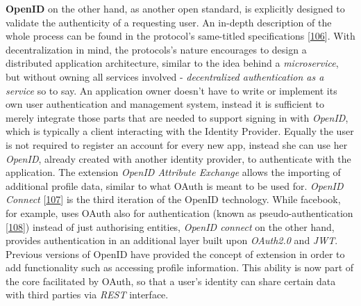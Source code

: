 \documentclass[12pt,english,a4paper,titlepage,cleardoublepage=empty,dottedtoc]{report}
\begin{document}
\textbf{OpenID} on the other hand, as another open standard, is
explicitly designed to validate the authenticity of a requesting user.
An in-depth description of the whole process can be found in the
protocol's same-titled specifications
{[}\protect\hyperlink{ref-web_spec_openid-spec-index}{106}{]}. With
decentralization in mind, the protocols's nature encourages to design a
distributed application architecture, similar to the idea behind a
\emph{microservice}, but without owning all services involved -
\emph{decentralized authentication as a service} so to say. An
application owner doesn't have to write or implement its own user
authentication and management system, instead it is sufficient to merely
integrate those parts that are needed to support signing in with
\emph{OpenID}, which is typically a client interacting with the Identity
Provider. Equally the user is not required to register an account for
every new app, instead she can use her \emph{OpenID}, already created
with another identity provider, to authenticate with the application.
The extension \emph{OpenID Attribute Exchange} allows the importing of
additional profile data, similar to what OAuth is meant to be used for.
\emph{OpenID Connect}
{[}\protect\hyperlink{ref-web_spec_openid-connect-1}{107}{]} is the
third iteration of the OpenID technology. While facebook, for example,
uses OAuth also for authentication (known as pseudo-authentication
{[}\protect\hyperlink{ref-web_2017_wikipedia_openid-vs-pseudo-oauth}{108}{]})
instead of just authorising entities, \emph{OpenID connect} on the other
hand, provides authentication in an additional layer built upon
\emph{OAuth2.0} and \emph{JWT}. Previous versions of OpenID have
provided the concept of extension in order to add functionality such as
accessing profile information. This ability is now part of the core
facilitated by OAuth, so that a user's identity can share certain data
with third parties via \emph{REST} interface.
\end{document}
